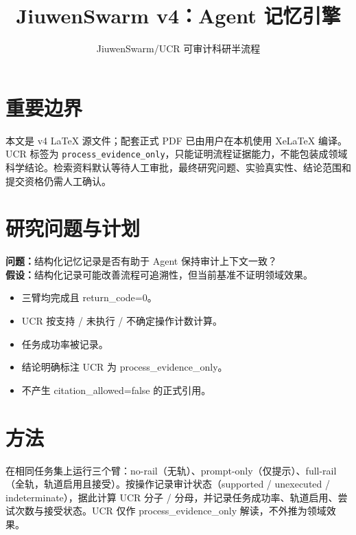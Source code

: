 \documentclass[UTF8]{ctexart}
\title{JiuwenSwarm v4：Agent 记忆引擎}
\author{JiuwenSwarm/UCR 可审计科研半流程}
\date{}
\begin{document}
\maketitle
\section{重要边界}
本文是 v4 LaTeX 源文件；配套正式 PDF 已由用户在本机使用 XeLaTeX 编译。UCR 标签为 \texttt{process\_evidence\_only}，只能证明流程证据能力，不能包装成领域科学结论。检索资料默认等待人工审批，最终研究问题、实验真实性、结论范围和提交资格仍需人工确认。
\section{研究问题与计划}
\textbf{问题：}结构化记忆记录是否有助于 Agent 保持审计上下文一致？\\
\textbf{假设：}结构化记录可能改善流程可追溯性，但当前基准不证明领域效果。
\begin{itemize}
\item 三臂均完成且 return\_\allowbreak{}code=0。
\item UCR 按支持 / 未执行 / 不确定操作计数计算。
\item 任务成功率被记录。
\item 结论明确标注 UCR 为 process\_\allowbreak{}evidence\_\allowbreak{}only。
\item 不产生 citation\_\allowbreak{}allowed=false 的正式引用。
\end{itemize}
\section{方法}
在相同任务集上运行三个臂：no-\allowbreak{}rail（无轨）、prompt-\allowbreak{}only（仅提示）、full-\allowbreak{}rail（全轨，轨道启用且接受）。按操作记录审计状态（supported / unexecuted / indeterminate），据此计算 UCR 分子 / 分母，并记录任务成功率、轨道启用、尝试次数与接受状态。UCR 仅作 process\_\allowbreak{}evidence\_\allowbreak{}only 解读，不外推为领域效果。
\end{document}
